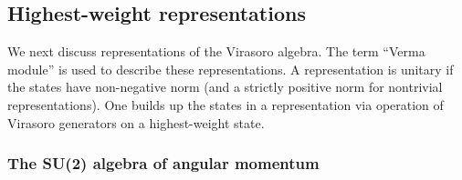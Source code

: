 \subsection{Highest-weight representations}

We next discuss representations of the Virasoro algebra. The term ``Verma module'' is used to describe these
representations. A representation is unitary if the states have non-negative norm (and a strictly positive norm for
nontrivial representations). One builds up the states in a representation via operation of Virasoro generators on a
highest-weight state.

\subsubsection*{The SU(2) algebra of angular momentum}


